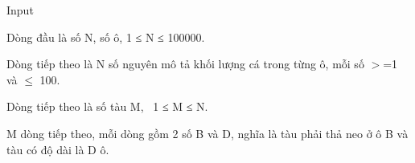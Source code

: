 Input
 

Dòng đầu là số N, số ô, 1 ≤ N ≤ 100000.

Dòng tiếp theo là N số nguyên mô tả khối lượng cá trong từng ô, mỗi số $>$=1 và  $\le$ 100.

Dòng tiếp theo là số tàu M,  1 ≤ M ≤ N.

M dòng tiếp theo, mỗi dòng gồm 2 số B và D, nghĩa là tàu phải thả neo ở ô B và tàu có độ dài là D ô.

 